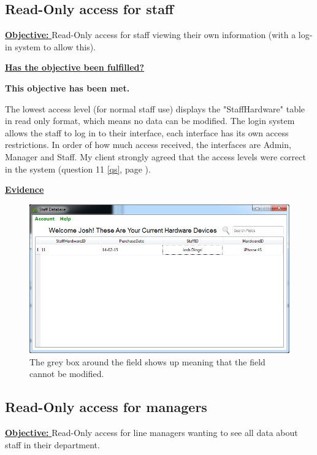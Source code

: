 \subsection{Read-Only access for staff}

\underline{\textbf{Objective:} }  Read-Only access for staff viewing their own information (with a log-in system to allow this).

\underline{\textbf{Has the objective been fulfilled?}}

\textbf{This objective has been met.}

The lowest access level (for normal staff use) displays the "StaffHardware" table in read only format, which means no data can be modified. The login system allows the staff to log in to their interface, each interface has its own access restrictions. In order of how much access received, the interfaces are Admin, Manager and Staff. My client strongly agreed that the access levels were correct in the system (question 11 \ref{qs}, page \pageref{qs}).

\underline{\textbf{Evidence}}

\begin{figure}[H]
    \includegraphics[width=\textwidth]{./Evaluation/Images/readonlystaff.png}
    \caption{The grey box around the field shows up meaning that the field cannot be modified.} 
\end{figure}



\subsection{Read-Only access for managers}

\underline{\textbf{Objective:} } Read-Only access for line managers wanting to see all data about staff in their department.

